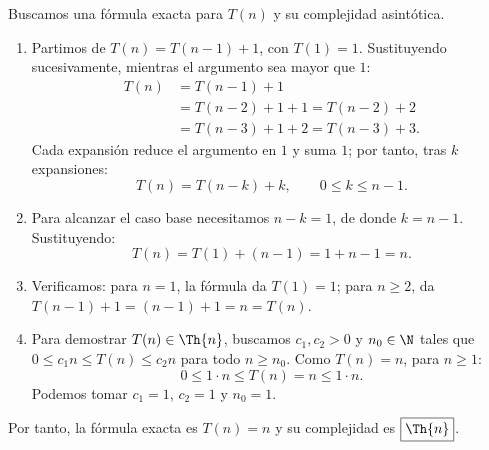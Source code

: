 
Buscamos una fórmula exacta para $T(n)$ y su complejidad asintótica.

\begin{enumerate}
\item Partimos de $T(n)=T(n-1)+1$, con $T(1)=1$. Sustituyendo sucesivamente, mientras el argumento sea mayor que $1$:
\[
\begin{aligned}
T(n)&=T(n-1)+1\\
&=T(n-2)+1+1=T(n-2)+2\\
&=T(n-3)+1+2=T(n-3)+3.
\end{aligned}
\]
Cada expansión reduce el argumento en $1$ y suma $1$; por tanto, tras $k$ expansiones:
\[
T(n)=T(n-k)+k,\qquad 0\le k\le n-1.
\]

\item Para alcanzar el caso base necesitamos $n-k=1$, de donde $k=n-1$. Sustituyendo:
\[
T(n)=T(1)+(n-1)=1+n-1=\boxed{n}.
\]

\item Verificamos: para $n=1$, la fórmula da $T(1)=1$; para $n\ge2$, da $T(n-1)+1=(n-1)+1=n=T(n)$.

\item Para demostrar $T(n)\in\Th{n}$, buscamos $c_1,c_2>0$ y $n_0\in\N$ tales que $0\le c_1n\le T(n)\le c_2n$ para todo $n\ge n_0$. Como $T(n)=n$, para $n\ge1$:
\[
0\le 1\cdot n\le T(n)=n\le 1\cdot n.
\]
Podemos tomar $c_1=1$, $c_2=1$ y $n_0=1$.
\end{enumerate}

Por tanto, la fórmula exacta es $\boxed{T(n)=n}$ y su complejidad es $\boxed{\Th{n}}$.
\fin
